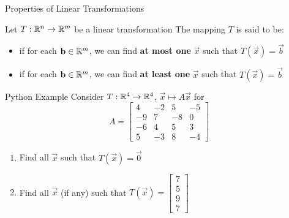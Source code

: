 \documentclass[xcoler=dvipsnames, aspectratio=169]{beamer}
\begin{document}
\begin{frame}{Properties of Linear Transformations}
    \begin{tcolorbox}
        Let $T:\mathbb{R}^n\rightarrow\mathbb{R}^m$ be a linear transformation The mapping $T$ is said to be:
        \begin{itemize}
            \item {} if for each $\mathbf{b}\in\mathbb{R}^m$, we can find \textbf{at most one} 
                $\vec{x}$ such that $T(\vec{x})=\vec{b}$\pause
            \item {} if for each $\mathbf{b}\in\mathbb{R}^m$, we can find \textbf{at least one}
                $\vec{x}$ such that $T(\vec{x})=\vec{b}$
        \end{itemize}
    \end{tcolorbox}
        \vspace{150pt}
\end{frame}
\begin{frame}{Python Example}
    Consider $T: \mathbb{R}^4\rightarrow\mathbb{R}^4$, $\vec{x}\mapsto A\vec{x}$ for
    \[
        A = \begin{bmatrix}4 & -2 & 5 & -5 \\
            -9 & 7 & -8 & 0\\
            -6&4&5&3\\
            5&-3&8&-4
        \end{bmatrix}
    \]
    \begin{enumerate}
        \item Find all $\vec{x}$ such that $T(\vec{x}) = \vec{0}$
        \item Find all $\vec{x}$ (if any) such that $T(\vec{x}) = \begin{bmatrix}7\\5\\9\\7\end{bmatrix}$
    \end{enumerate}
\end{frame}
\end{document}

